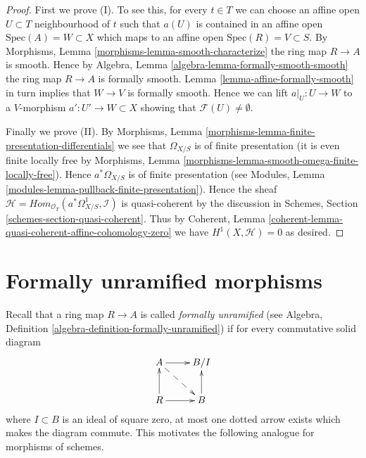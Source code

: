 \begin{proof}
\medskip\noindent
First we prove (I). To see this, for every $t \in T$ we can
choose an affine open $U \subset T$ neighbourhood of $t$
such that $a(U)$ is contained
in an affine open $\text{Spec}(A) = W \subset X$
which maps to an affine open $\text{Spec}(R) = V \subset S$.
By Morphisms, Lemma \ref{morphisms-lemma-smooth-characterize}
the ring map $R \to A$ is smooth.
Hence by Algebra, Lemma \ref{algebra-lemma-formally-smooth-smooth}
the ring map $R \to A$ is formally smooth.
Lemma \ref{lemma-affine-formally-smooth}
in turn implies that $W \to V$ is formally smooth.
Hence we can lift $a|_U : U \to W$ to a $V$-morphism
$a' : U' \to W \subset X$ showing that $\mathcal{F}(U) \not = \emptyset$.

\medskip\noindent
Finally we prove (II).
By Morphisms, Lemma \ref{morphisms-lemma-finite-presentation-differentials}
we see that $\Omega_{X/S}$ is of finite presentation
(it is even finite locally free by
Morphisms, Lemma \ref{morphisms-lemma-smooth-omega-finite-locally-free}).
Hence $a^*\Omega_{X/S}$ is of finite presentation (see
Modules, Lemma \ref{modules-lemma-pullback-finite-presentation}).
Hence the sheaf
$\mathcal{H} = \textit{Hom}_{\mathcal{O}_T}(a^*\Omega^1_{X/S}, \mathcal{I})$
is quasi-coherent by the discussion in
Schemes, Section \ref{schemes-section-quasi-coherent}.
Thus by
Coherent, Lemma \ref{coherent-lemma-quasi-coherent-affine-cohomology-zero}
we have $H^1(X, \mathcal{H}) = 0$ as desired.
\end{proof}













\section{Formally unramified morphisms}
\label{section-formally-unramified}

\noindent
Recall that a ring map $R \to A$ is called {\it formally unramified}
(see Algebra, Definition \ref{algebra-definition-formally-unramified})
if for every commutative solid diagram
$$
\xymatrix{
A \ar[r] \ar@{-->}[rd] & B/I \\
R \ar[r] \ar[u] & B \ar[u]
}
$$
where $I \subset B$ is an ideal of square zero, at most one dotted
arrow exists which makes the diagram commute. This motivates
the following analogue for morphisms of schemes.

